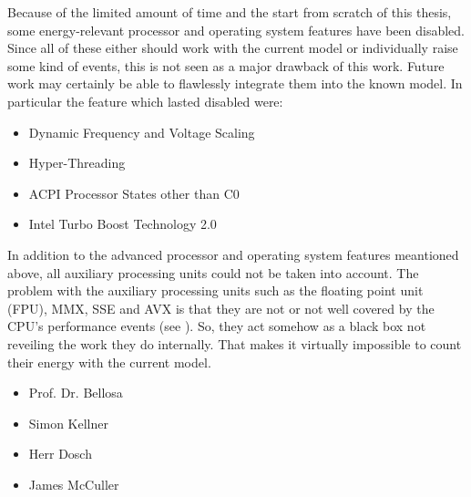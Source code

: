 Because of the limited amount of time and the start from scratch of this thesis,
some energy-relevant processor and operating system features have been disabled.
Since all of these either should work with the current model or individually
raise some kind of events, this is not seen as a major drawback of this work.
Future work may certainly be able to flawlessly integrate them into the known
model. In particular the feature which lasted disabled were:

\begin{itemize}

\item Dynamic Frequency and Voltage Scaling \cite{wiki:DVFS}

\item Hyper-Threading \cite{wiki:HT}

\item ACPI Processor States other than C0 \cite{wiki:ACPI}

\item Intel\TReg{} Turbo Boost Technology 2.0 \cite{wiki:IntelTurboBoost}

\end{itemize}

In addition to the advanced processor and operating system features meantioned
above, all auxiliary processing units could not be taken into account. The
problem with the auxiliary processing units such as the floating point unit
(FPU), MMX\cite{wiki:MMX}, SSE\cite{wiki:SSE} and AVX\cite{wiki:AVX} is that
they are not or not well covered by the CPU's performance events (see
\cite{intel2011events}). So, they act somehow as a black box not reveiling the
work they do internally. That makes it virtually impossible to count their
energy with the current model.


\begin{itemize}

\item Prof. Dr. Bellosa

\item Simon Kellner

\item Herr Dosch

\item James McCuller

\end{itemize}

